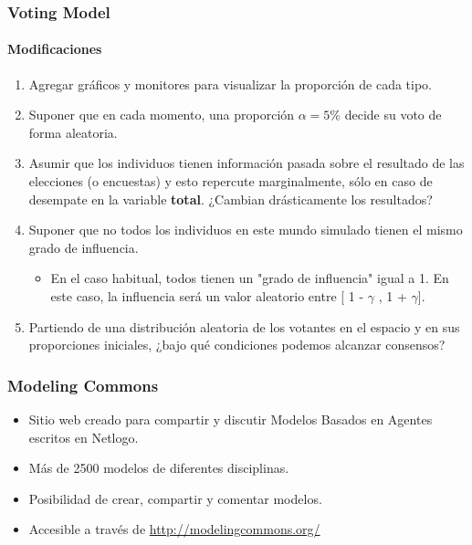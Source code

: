 \documentclass[11pt]{beamer}
\begin{document}
\begin{frame}
	\frametitle{Voting Model}
	\framesubtitle{Modificaciones}
\begin{enumerate}
	\item<1-> Agregar gráficos y monitores para visualizar la proporción de cada tipo.
	\item<2-> Suponer que en cada momento, una proporción $\alpha=5\%$ decide su voto de forma aleatoria.
	\item<3-> Asumir que los individuos tienen información pasada sobre el resultado de las elecciones (o encuestas) y esto repercute marginalmente, sólo en caso de desempate en la variable \textbf{total}. ¿Cambian drásticamente los resultados?
	\item<4-> Suponer que no todos los individuos en este mundo simulado tienen el mismo grado de influencia.
	\begin{itemize}
		\item En el caso habitual, todos tienen un "grado de influencia" igual a 1. En este caso, la influencia será un valor aleatorio entre [ 1 - $\gamma$ , 1 + $\gamma$]. 
	\end{itemize}  
	\item<5-> Partiendo de una distribución aleatoria de los votantes en el espacio y en sus proporciones iniciales, ¿bajo qué condiciones podemos alcanzar consensos?  
\end{enumerate}
\end{frame}


\begin{frame}
\frametitle{Modeling Commons}
\begin{itemize}
	\item Sitio web creado para compartir y discutir Modelos Basados en Agentes escritos en Netlogo.
	\item Más de 2500 modelos de diferentes disciplinas.
	\item Posibilidad de crear, compartir y comentar modelos.
	\item Accesible a través de \url{http://modelingcommons.org/}
\end{itemize}
\end{frame}
\end{document}
